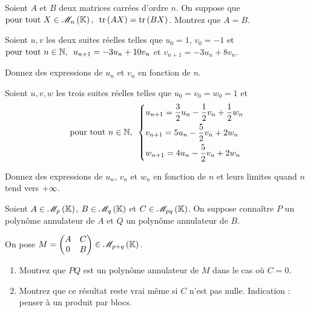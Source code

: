 \begin{exops}[Exercice 25]
Soient \(A\) et \(B\) deux matrices carrées d'ordre \(n\). On suppose que \(\quantifs{\tpt X\in\M{n}}\tr\paren{AX}=\tr\paren{BX}\). Montrez que \(A=B\).
\end{exops}



\begin{exos}[Exercice 26]
Soient \(u,v\) les deux suites réelles telles que \(u_0=1\), \(v_0=-1\) et \(\quantifs{\tpt n\in\N}u_{n+1}=-3u_n+10v_n\) et \(v_{n+1}=-3u_n+8v_n\).

Donnez des expressions de \(u_n\) et \(v_n\) en fonction de \(n\).
\end{exos}



\begin{exoss}[Exercice 27]
Soient \(u,v,w\) les trois suites réelles telles que \(u_0=v_0=w_0=1\) et \[\quantifs{\tpt n\in\N}\begin{dcases}
u_{n+1}=\dfrac{3}{2}u_n-\dfrac{1}{2}v_n+\dfrac{1}{2}w_n \\
v_{n+1}=5u_n-\dfrac{5}{2}v_n+2w_n \\
w_{n+1}=4u_n-\dfrac{5}{2}v_n+2w_n
\end{dcases}\]

Donnez des expressions de \(u_n\), \(v_n\) et \(w_n\) en fonction de \(n\) et leurs limites quand \(n\) tend vers \(+\infty\).
\end{exoss}



\begin{exopss}[Exercice 28]
Soient \(A\in\M{p}\), \(B\in\M{q}\) et \(C\in\M{pq}\). On suppose connaître \(P\) un polynôme annulateur de \(A\) et \(Q\) un polynôme annulateur de \(B\).

On pose \(M=\begin{pmatrix}A & C \\ 0 & B\end{pmatrix}\in\M{p+q}\).

\begin{enumerate}
    \item Montrez que \(PQ\) est un polynôme annulateur de \(M\) dans le cas où \(C=0\). \\
    \item Montrez que ce résultat reste vrai même si \(C\) n'est pas nulle. Indication : penser à un produit par blocs.
\end{enumerate}
\end{exopss}



